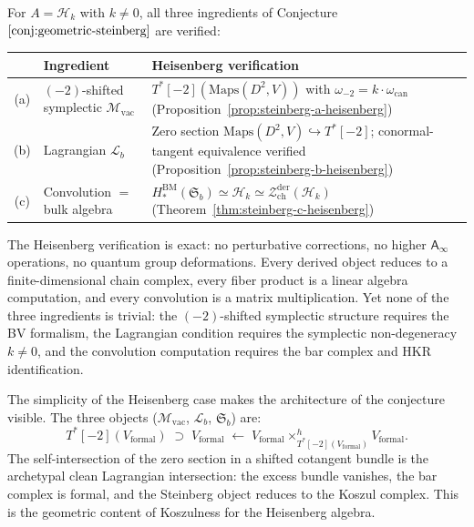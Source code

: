 \documentclass[11pt]{article}
\newcommand{\cM}{\mathcal{M}}
\newcommand{\cH}{\mathcal{H}}
\newcommand{\cZ}{\mathcal{Z}}
\newcommand{\cL}{\mathcal{L}}
\newcommand{\Ainf}{\mathsf{A}_{\infty}}
\newcommand{\Zder}{\cZ^{\mathrm{der}}_{\mathrm{ch}}}
\begin{document}
\begin{theorem}
\label{thm:geometric-steinberg-heisenberg}
For $A = \cH_k$ with $k \ne 0$, all three ingredients of
Conjecture~$\ref{conj:geometric-steinberg}$ are verified:
\begin{center}
\renewcommand{\arraystretch}{1.3}
\begin{tabular}{@{}clp{7.2cm}@{}}
\hline
& \textbf{Ingredient} & \textbf{Heisenberg verification} \\
\hline
\textup{(a)}
  & $(-2)$-shifted symplectic $\cM_{\mathrm{vac}}$
  & $T^*[-2](\mathrm{Maps}(D^2,V))$ with
    $\omega_{-2} = k \cdot \omega_{\mathrm{can}}$
    \textup{(}Proposition~\ref{prop:steinberg-a-heisenberg}\textup{)} \\
\textup{(b)}
  & Lagrangian $\cL_b$
  & Zero section $\mathrm{Maps}(D^2,V) \hookrightarrow
    T^*[-2]$; conormal-tangent equivalence verified
    \textup{(}Proposition~\ref{prop:steinberg-b-heisenberg}\textup{)} \\
\textup{(c)}
  & Convolution $=$ bulk algebra
  & $H_*^{\mathrm{BM}}(\mathfrak{S}_b) \simeq \cH_k \simeq
    \Zder(\cH_k)$
    \textup{(}Theorem~\ref{thm:steinberg-c-heisenberg}\textup{)} \\
\hline
\end{tabular}
\end{center}
\end{theorem}

\begin{remark}
The Heisenberg verification is exact: no perturbative corrections,
no higher $\Ainf$ operations, no quantum group deformations.  Every
derived object reduces to a finite-dimensional chain complex, every
fiber product is a linear algebra computation, and every convolution
is a matrix multiplication.  Yet none of the three ingredients is
trivial: the $(-2)$-shifted symplectic structure requires the BV
formalism, the Lagrangian condition requires the symplectic
non-degeneracy $k \ne 0$, and the convolution computation requires
the bar complex and HKR identification.

The simplicity of the Heisenberg case makes the architecture of the
conjecture visible.  The three objects ($\cM_{\mathrm{vac}}$,
$\cL_b$, $\mathfrak{S}_b$) are:
\[
T^*[-2](V_{\mathrm{formal}})
\;\supset\;
V_{\mathrm{formal}}
\;\leftarrow\;
V_{\mathrm{formal}} \times^h_{T^*[-2](V_{\mathrm{formal}})}
V_{\mathrm{formal}}.
\]
The self-intersection of the zero section in a shifted cotangent
bundle is the archetypal clean Lagrangian intersection: the excess
bundle vanishes, the bar complex is formal, and the Steinberg
object reduces to the Koszul complex.  This is the geometric content
of Koszulness for the Heisenberg algebra.
\end{remark}
\end{document}
